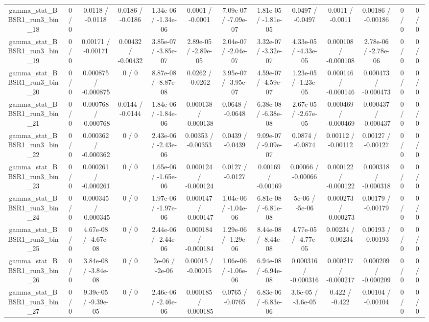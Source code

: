 \documentclass[10pt]{article}
\begin{document}
\begin{table}[htbp]
\begin{center}
\begin{tabular}{|c|c|c|c|c|c|c|c|c|c|c|c|c|}
  gamma_stat_BBSR1_run3_bin_18 & 0 / 0 & 0.0118 / -0.0118 & 0.0186 / -0.0186 & 1.34e-06 / -1.34e-06 & 0.0001 / -0.0001 & 7.09e-07 / -7.09e-07 & 1.81e-05 / -1.81e-05 & 0.0497 / -0.0497 & 0.0011 / -0.0011 & 0.00186 / -0.00186 & 0 / 0 & 0 / 0 \\ 
  gamma_stat_BBSR1_run3_bin_19 & 0 / 0 & 0.00171 / -0.00171 & 0.00432 / -0.00432 & 3.85e-07 / -3.85e-07 & 2.89e-05 / -2.89e-05 & 2.04e-07 / -2.04e-07 & 3.32e-07 / -3.32e-07 & 4.33e-05 / -4.33e-05 & 0.000108 / -0.000108 & 2.78e-06 / -2.78e-06 & 0 / 0 & 0 / 0 \\ 
  gamma_stat_BBSR1_run3_bin_20 & 0 / 0 & 0.000875 / -0.000875 & 0 / 0 & 8.87e-08 / -8.87e-08 & 0.0262 / -0.0262 & 3.95e-07 / -3.95e-07 & 4.59e-07 / -4.59e-07 & 1.23e-05 / -1.23e-05 & 0.000146 / -0.000146 & 0.000473 / -0.000473 & 0 / 0 & 0 / 0 \\ 
  gamma_stat_BBSR1_run3_bin_21 & 0 / 0 & 0.000768 / -0.000768 & 0.0144 / -0.0144 & 1.84e-06 / -1.84e-06 & 0.000138 / -0.000138 & 0.0648 / -0.0648 & 6.38e-08 / -6.38e-08 & 2.67e-05 / -2.67e-05 & 0.000469 / -0.000469 & 0.000437 / -0.000437 & 0 / 0 & 0 / 0 \\ 
  gamma_stat_BBSR1_run3_bin_22 & 0 / 0 & 0.000362 / -0.000362 & 0 / 0 & 2.43e-06 / -2.43e-06 & 0.00353 / -0.00353 & 0.0439 / -0.0439 & 9.09e-07 / -9.09e-07 & 0.0874 / -0.0874 & 0.00112 / -0.00112 & 0.00127 / -0.00127 & 0 / 0 & 0 / 0 \\ 
  gamma_stat_BBSR1_run3_bin_23 & 0 / 0 & 0.000261 / -0.000261 & 0 / 0 & 1.65e-06 / -1.65e-06 & 0.000124 / -0.000124 & 0.0127 / -0.0127 & 0.00169 / -0.00169 & 0.00066 / -0.00066 & 0.000122 / -0.000122 & 0.000318 / -0.000318 & 0 / 0 & 0 / 0 \\ 
  gamma_stat_BBSR1_run3_bin_24 & 0 / 0 & 0.000345 / -0.000345 & 0 / 0 & 1.97e-06 / -1.97e-06 & 0.000147 / -0.000147 & 1.04e-06 / -1.04e-06 & 6.81e-08 / -6.81e-08 & 5e-06 / -5e-06 & 0.000273 / -0.000273 & 0.00179 / -0.00179 & 0 / 0 & 0 / 0 \\ 
  gamma_stat_BBSR1_run3_bin_25 & 0 / 0 & 4.67e-08 / -4.67e-08 & 0 / 0 & 2.44e-06 / -2.44e-06 & 0.000184 / -0.000184 & 1.29e-06 / -1.29e-06 & 8.44e-08 / -8.44e-08 & 4.77e-05 / -4.77e-05 & 0.00234 / -0.00234 & 0.00193 / -0.00193 & 0 / 0 & 0 / 0 \\ 
  gamma_stat_BBSR1_run3_bin_26 & 0 / 0 & 3.84e-08 / -3.84e-08 & 0 / 0 & 2e-06 / -2e-06 & 0.00015 / -0.00015 & 1.06e-06 / -1.06e-06 & 6.94e-08 / -6.94e-08 & 0.000316 / -0.000316 & 0.000217 / -0.000217 & 0.000209 / -0.000209 & 0 / 0 & 0 / 0 \\ 
  gamma_stat_BBSR1_run3_bin_27 & 0 / 0 & 9.39e-05 / -9.39e-05 & 0 / 0 & 2.46e-06 / -2.46e-06 & 0.000185 / -0.000185 & 0.0765 / -0.0765 & 6.83e-06 / -6.83e-06 & 3.6e-05 / -3.6e-05 & 0.422 / -0.422 & 0.00104 / -0.00104 & 0 / 0 & 0 / 0 \\ 

\end{tabular}
\end{center}
\end{table}
\end{document}
